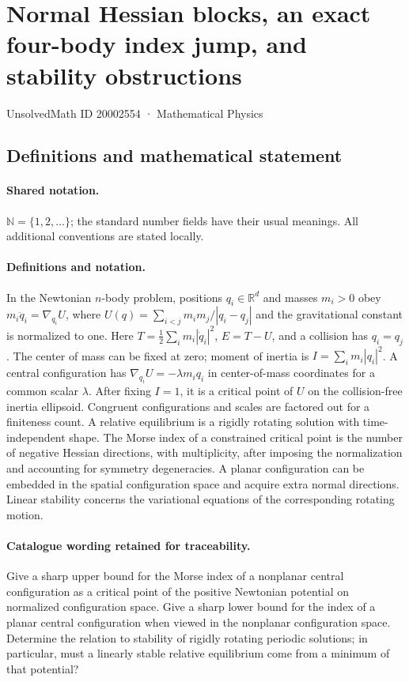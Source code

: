 \documentclass[11pt]{article}
\begin{document}
\setcounter{section}{20002553}
\section{Normal Hessian blocks, an exact four-body index jump, and stability obstructions}\label{20002554}
{\small UnsolvedMath ID 20002554 · Mathematical Physics}
\subsection{Definitions and mathematical statement}

\paragraph{Shared notation.}$\mathbb N=\{1,2,\ldots\}$; the standard number fields have their usual meanings. All additional conventions are stated locally.


\paragraph{Definitions and notation.}In the Newtonian $n$-body problem, positions $q_i\in\mathbb R^d$ and masses $m_i>0$ obey $m_i\ddot q_i=\nabla_{q_i}U$, where $U(q)=\sum_{i<j}m_im_j/|q_i-q_j|$ and the gravitational constant is normalized to one. Here $T=\tfrac12\sum_i m_i|\dot q_i|^2$, $E=T-U$, and a collision has $q_i=q_j$. The center of mass can be fixed at zero; moment of inertia is $I=\sum_i m_i|q_i|^2$. A central configuration has $\nabla_{q_i}U=-\lambda m_iq_i$ in center-of-mass coordinates for a common scalar $\lambda$. After fixing $I=1$, it is a critical point of $U$ on the collision-free inertia ellipsoid. Congruent configurations and scales are factored out for a finiteness count. A relative equilibrium is a rigidly rotating solution with time-independent shape. The Morse index of a constrained critical point is the number of negative Hessian directions, with multiplicity, after imposing the normalization and accounting for symmetry degeneracies. A planar configuration can be embedded in the spatial configuration space and acquire extra normal directions. Linear stability concerns the variational equations of the corresponding rotating motion.

\paragraph{Catalogue wording retained for traceability.}
Give a sharp upper bound for the Morse index of a nonplanar central configuration as a critical point of the positive Newtonian potential on normalized configuration space. Give a sharp lower bound for the index of a planar central configuration when viewed in the nonplanar configuration space. Determine the relation to stability of rigidly rotating periodic solutions; in particular, must a linearly stable relative equilibrium come from a minimum of that potential?
\end{document}
